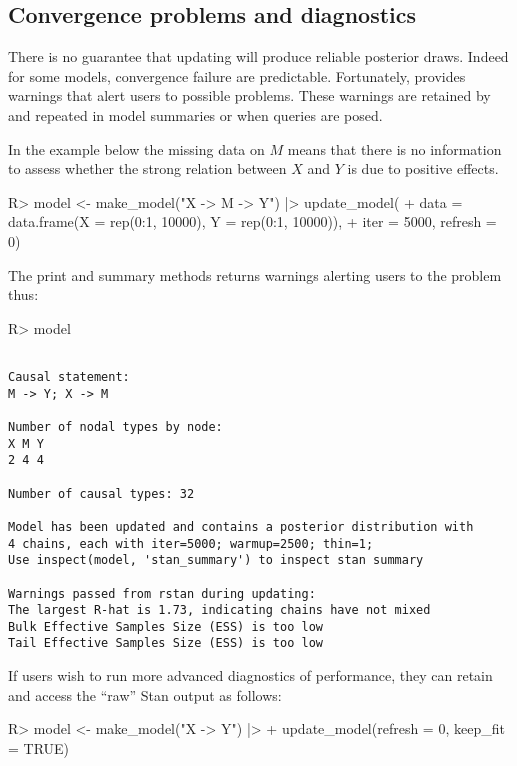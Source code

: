 \documentclass[
  11pt,
  article]{jss}
\renewcommand{\texttt}[1]{\code{#1}}
\begin{document}
\subsection{Convergence problems and
diagnostics}\label{convergence-problems-and-diagnostics}

There is no guarantee that updating will produce reliable posterior
draws. Indeed for some models, convergence failure are predictable.
Fortunately, \texttt{stan} provides warnings that alert users to
possible problems. These warnings are retained by 
and repeated in model summaries or when queries are posed.

In the example below the missing data on \(M\) means that there is no
information to assess whether the strong relation between \(X\) and
\(Y\) is due to positive effects.

\begin{CodeInput}
R> model <- make_model("X -> M -> Y") |> update_model(
+    data = data.frame(X = rep(0:1, 10000), Y = rep(0:1, 10000)), 
+    iter = 5000, refresh = 0)
\end{CodeInput}

The print and summary methods returns warnings alerting users to the
problem thus:

\begin{CodeInput}
R> model
\end{CodeInput}

\begin{verbatim}

Causal statement: 
M -> Y; X -> M

Number of nodal types by node:
X M Y 
2 4 4 

Number of causal types: 32

Model has been updated and contains a posterior distribution with
4 chains, each with iter=5000; warmup=2500; thin=1;  
Use inspect(model, 'stan_summary') to inspect stan summary

Warnings passed from rstan during updating:
The largest R-hat is 1.73, indicating chains have not mixed
Bulk Effective Samples Size (ESS) is too low
Tail Effective Samples Size (ESS) is too low 
\end{verbatim}

If users wish to run more advanced diagnostics of performance, they can
retain and access the ``raw'' Stan output as follows:

\begin{CodeInput}
R> model <- make_model("X -> Y") |> 
+    update_model(refresh = 0, keep_fit = TRUE)
\end{CodeInput}
\end{document}
